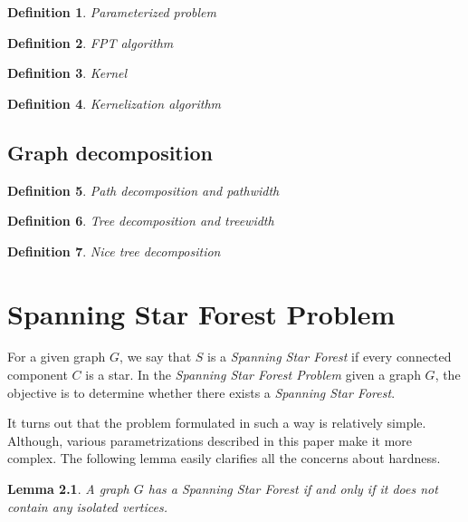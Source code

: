 \documentclass[en]{pracamgr}
\newtheorem{defi}{Definition}
\newtheorem{lemma}{Lemma}
\begin{document}
\begin{defi}\label{Parameterized problem}
	Parameterized problem
\end{defi}

\begin{defi}\label{FPT algorithm}
	FPT algorithm
\end{defi}

\begin{defi}\label{Kernel}
	Kernel
\end{defi}

\begin{defi}\label{Kernelization algorithm}
	Kernelization algorithm
\end{defi}

\section{Graph decomposition}

\begin{defi}\label{Pathwidth}
	Path decomposition and pathwidth
\end{defi}

\begin{defi}\label{Treewidth}
	Tree decomposition and treewidth
\end{defi}

\begin{defi}\label{nice tree decomposition}
	Nice tree decomposition
\end{defi}

\chapter{Spanning Star Forest Problem}\label{r:losers}

For a given graph $G$, we say that $S$ is a \emph{Spanning Star Forest}
if every connected component $C$ is a star. In the 
\emph{Spanning Star Forest Problem} given a graph $G$, the objective is
to determine whether there exists a \emph{Spanning Star Forest}. 

It turns out that the problem formulated in such a way is relatively 
simple. Although, various parametrizations described in this paper 
make it more complex. The following lemma easily clarifies all the 
concerns about hardness.

\begin{lemma}\label{SSF lemma}
 A graph $G$ has a Spanning Star Forest if and only if it does not contain
 any isolated vertices.
\end{lemma}
\end{document}
